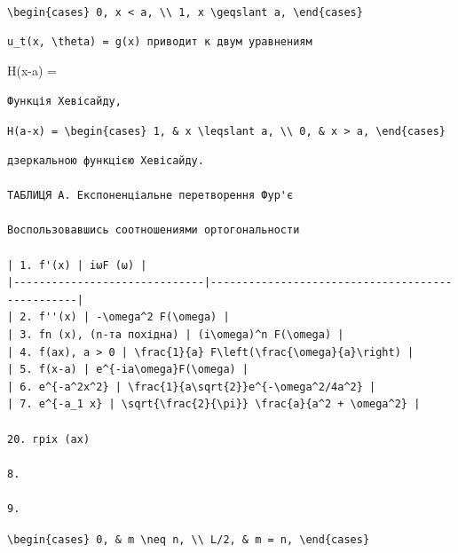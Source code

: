 \documentclass[
  ukrainian,
]{article}
\begin{document}
\texttt{\textbackslash{}begin\{cases\}\ 0,\ x\ \textless{}\ a,\ \textbackslash{}\textbackslash{}\ 1,\ x\ \textbackslash{}geqslant\ a,\ \textbackslash{}end\{cases\}}

\begin{verbatim}
u_t(x, \theta) = g(x) приводит к двум уравнениям
\end{verbatim}

H(x-a) =

\begin{verbatim}
Функція Хевісайду,
\end{verbatim}

\texttt{H(a-x)\ =\ \textbackslash{}begin\{cases\}\ 1,\ \&\ x\ \textbackslash{}leqslant\ a,\ \textbackslash{}\textbackslash{}\ 0,\ \&\ x\ \textgreater{}\ a,\ \textbackslash{}end\{cases\}}

\begin{verbatim}
дзеркальною функцією Хевісайду.

ТАБЛИЦЯ A. Експоненціальне перетворення Фур'є

Воспользовавшись соотношениями ортогональности

| 1. f'(x) | iωF (ω) |
|------------------------------|-------------------------------------------------|
| 2. f''(x) | -\omega^2 F(\omega) |
| 3. fn (x), (n-та похідна) | (i\omega)^n F(\omega) |
| 4. f(ax), a > 0 | \frac{1}{a} F\left(\frac{\omega}{a}\right) |
| 5. f(x-a) | e^{-ia\omega}F(\omega) |
| 6. e^{-a^2x^2} | \frac{1}{a\sqrt{2}}e^{-\omega^2/4a^2} |
| 7. e^{-a_1 x} | \sqrt{\frac{2}{\pi}} \frac{a}{a^2 + \omega^2} |

20. гріх (ax)

8.

9.
\end{verbatim}

\texttt{\textbackslash{}begin\{cases\}\ 0,\ \&\ m\ \textbackslash{}neq\ n,\ \textbackslash{}\textbackslash{}\ L/2,\ \&\ m\ =\ n,\ \textbackslash{}end\{cases\}}
\end{document}
